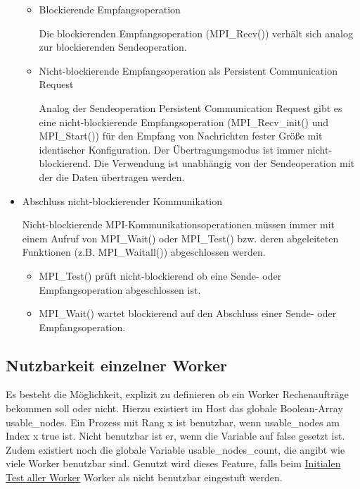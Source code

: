\begin{itemize}
\begin{itemize}
		      \item Blockierende Empfangsoperation

		            Die blockierenden Empfangsoperation (MPI\_Recv()) verhält sich analog zur blockierenden Sendeoperation.

		      \item Nicht-blockierende Empfangsoperation als Persistent Communication Request

		            Analog der Sendeoperation Persistent Communication Request gibt es eine nicht-blockierende Empfangsoperation (MPI\_Recv\_init() und MPI\_Start()) für den Empfang von Nachrichten fester Größe mit identischer Konfiguration. Der Übertragungsmodus ist immer nicht-blockierend. Die Verwendung ist unabhängig von der Sendeoperation mit der die Daten übertragen werden.

	      \end{itemize}

	\item Abschluss nicht-blockierender Kommunikation

	      Nicht-blockierende MPI-Kommunikationsoperationen müssen immer mit einem Aufruf von MPI\_Wait() oder MPI\_Test() bzw. deren abgeleiteten Funktionen (z.B. MPI\_Waitall()) abgeschlossen werden.

	      \begin{itemize}
		      \item MPI\_Test() prüft nicht-blockierend ob eine Sende- oder Empfangsoperation abgeschlossen ist.

		      \item MPI\_Wait() wartet blockierend auf den Abschluss einer Sende- oder Empfangsoperation.
	      \end{itemize}

\end{itemize}

\subsection{Nutzbarkeit einzelner Worker}

Es besteht die Möglichkeit, explizit zu definieren ob ein Worker Rechenaufträge bekommen soll oder nicht.
Hierzu existiert im Host das globale Boolean-Array usable\_nodes.
Ein Prozess mit Rang x ist benutzbar, wenn usable\_nodes am Index x true ist.
Nicht benutzbar ist er, wenn die Variable auf false gesetzt ist.
Zudem existiert noch die globale Variable usable\_nodes\_count, die angibt wie viele Worker benutzbar sind.
Genutzt wird dieses Feature, falls beim \hyperref[para:init_worker_test]{Initialen Test aller Worker} Worker als nicht benutzbar eingestuft werden.


